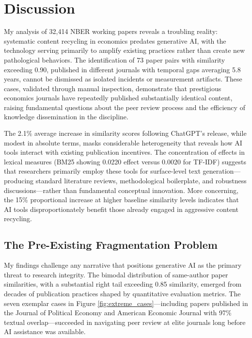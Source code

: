 \documentclass[12pt]{article}
\begin{document}
\section{Discussion}
\label{sec:discussion}

My analysis of 32,414 NBER working papers reveals a troubling reality: systematic content recycling in economics predates generative AI, with the technology serving primarily to amplify existing practices rather than create new pathological behaviors. The identification of 73 paper pairs with similarity exceeding 0.90, published in different journals with temporal gaps averaging 5.8 years, cannot be dismissed as isolated incidents or measurement artifacts. These cases, validated through manual inspection, demonstrate that prestigious economics journals have repeatedly published substantially identical content, raising fundamental questions about the peer review process and the efficiency of knowledge dissemination in the discipline.

The 2.1\% average increase in similarity scores following ChatGPT's release, while modest in absolute terms, masks considerable heterogeneity that reveals how AI tools interact with existing publication incentives. The concentration of effects in lexical measures (BM25 showing 0.0220 effect versus 0.0020 for TF-IDF) suggests that researchers primarily employ these tools for surface-level text generation—producing standard literature reviews, methodological boilerplate, and robustness discussions—rather than fundamental conceptual innovation. More concerning, the 15\% proportional increase at higher baseline similarity levels indicates that AI tools disproportionately benefit those already engaged in aggressive content recycling.

\subsection{The Pre-Existing Fragmentation Problem}

My findings challenge any narrative that positions generative AI as the primary threat to research integrity. The bimodal distribution of same-author paper similarities, with a substantial right tail exceeding 0.85 similarity, emerged from decades of publication practices shaped by quantitative evaluation metrics. The seven exemplar cases in Figure \ref{fig:extreme_cases}—including papers published in the Journal of Political Economy and American Economic Journal with 97\% textual overlap—succeeded in navigating peer review at elite journals long before AI assistance was available.
\end{document}
